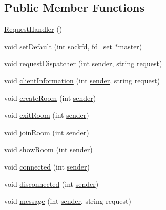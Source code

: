 \subsection*{Public Member Functions}
\begin{DoxyCompactItemize}
\item 
\hyperlink{class_request_handler_a5f47febd4b90dd6fc49b1f8303247c69}{Request\+Handler} ()
\item 
void \hyperlink{class_request_handler_a2e195879aa53692d5370d72dcc2a5878}{set\+Default} (int \hyperlink{class_request_handler_a6f7f37ba12f014dafca8cb78cff298c8}{sockfd}, fd\+\_\+set $\ast$\hyperlink{class_request_handler_a213fc8dcf839e70561a591633546d98f}{master})
\item 
void \hyperlink{class_request_handler_a241962ea4c75b5e0be1937cfc129aae1}{request\+Dispatcher} (int \hyperlink{class_request_handler_a6323c8ad9911e4872973360dc83d87ea}{sender}, string request)
\item 
void \hyperlink{class_request_handler_a1d0e08b23da9fc32799770d4a54dfc19}{client\+Information} (int \hyperlink{class_request_handler_a6323c8ad9911e4872973360dc83d87ea}{sender}, string request)
\item 
void \hyperlink{class_request_handler_a760cd6fc41cc7f490c1d32ec81f82d5d}{create\+Room} (int \hyperlink{class_request_handler_a6323c8ad9911e4872973360dc83d87ea}{sender})
\item 
void \hyperlink{class_request_handler_abaea528a55051c351eb29e95a4826b33}{exit\+Room} (int \hyperlink{class_request_handler_a6323c8ad9911e4872973360dc83d87ea}{sender})
\item 
void \hyperlink{class_request_handler_a202db33f029e005e3c5eba9ef7c8556b}{join\+Room} (int \hyperlink{class_request_handler_a6323c8ad9911e4872973360dc83d87ea}{sender})
\item 
void \hyperlink{class_request_handler_a46d7477e46fad683391de05b86427ad8}{show\+Room} (int \hyperlink{class_request_handler_a6323c8ad9911e4872973360dc83d87ea}{sender})
\item 
void \hyperlink{class_request_handler_a094d07998fe012848b608e962891f60f}{connected} (int \hyperlink{class_request_handler_a6323c8ad9911e4872973360dc83d87ea}{sender})
\item 
void \hyperlink{class_request_handler_ac017e06204f80a122cfa537b99fcba42}{disconnected} (int \hyperlink{class_request_handler_a6323c8ad9911e4872973360dc83d87ea}{sender})
\item 
void \hyperlink{class_request_handler_a41f02a201ac3fd366db9f51ee90814b3}{message} (int \hyperlink{class_request_handler_a6323c8ad9911e4872973360dc83d87ea}{sender}, string request)
\end{DoxyCompactItemize}

